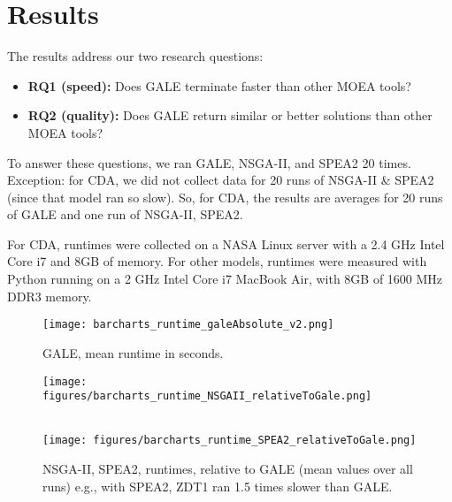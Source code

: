 \documentclass[10pt,journal,compsoc]{IEEEtran}
\newcommand{\bi}{\begin{itemize}}
\newcommand{\ei}{\end{itemize}}
\begin{document}
   

\section{Results}\label{sec:exps}

The results address our two research questions:
\bi
\item 
{\bf RQ1 (speed):} Does GALE terminate faster than other MOEA tools?
\item
{\bf RQ2 (quality):} Does GALE return  similar or better
solutions than other MOEA tools?
\ei
To answer these questions,
we ran GALE, NSGA-II, and SPEA2 20 times.
Exception: for CDA, we did not collect
data for 20 runs of NSGA-II \& SPEA2
(since that model ran so slow).
So, for CDA, the results are
averages for 20 runs of GALE and one run
of NSGA-II, SPEA2.

For CDA, runtimes were collected  on  a NASA Linux server with
a 2.4 GHz Intel Core i7 and 8GB of memory.
For other models,
runtimes were measured with Python  running on 
a 2 GHz Intel Core i7 MacBook Air, with 8GB of 1600 MHz DDR3 memory.



\begin{figure}[!b]
\begin{center}
\texttt{[image: barcharts\_runtime\_galeAbsolute\_v2.png]}
\end{center}
\caption{GALE, mean runtime in seconds.}\label{fig:runGale} 
\end{figure}


\begin{figure}[!b]
\begin{center}
\noindent
\texttt{[image: figures/barcharts\_runtime\_NSGAII\_relativeToGale.png]}

~\\

\noindent
\texttt{[image: figures/barcharts\_runtime\_SPEA2\_relativeToGale.png]}
\end{center}
\caption{NSGA-II, SPEA2, runtimes, relative to GALE (mean values
over all runs) e.g.,
with SPEA2, ZDT1 ran 1.5 times slower than GALE.}\label{fig:runSpea2} 
\end{figure}
\end{document}
